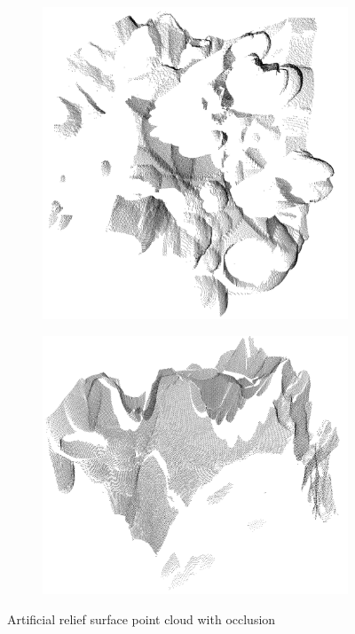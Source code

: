 \begin{figure}[h]
\centering
\begin{subfigure}{.5\textwidth}
\includegraphics[width=\linewidth]{fig/r1_occlusion.png}
\end{subfigure}%
\begin{subfigure}{.5\textwidth}
\includegraphics[width=\linewidth]{fig/r1_occlusion2.png}
\end{subfigure}
\caption{Artificial relief surface point cloud with occlusion}
\label{fig:relief_occlusion}
\end{figure}

